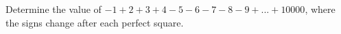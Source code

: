 Determine the value of $-1+2+3+4-5-6-7-8-9+...+10000$, where the signs change after each perfect square.
